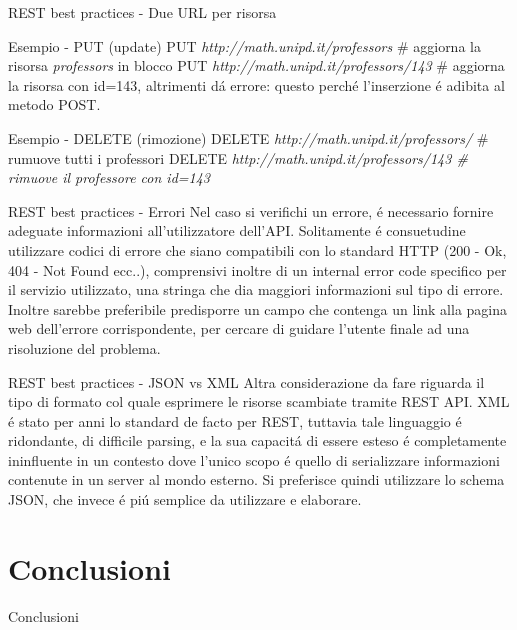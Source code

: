 \documentclass{beamer}
\begin{document}
\begin{frame}{REST best practices - Due URL per risorsa}
\begin{exampleblock}{Esempio - PUT (update)}
PUT \emph{http://math.unipd.it/professors} \# aggiorna la risorsa \emph{professors} in blocco
\newline
PUT \emph{http://math.unipd.it/professors/143} \# aggiorna la risorsa con id=143, altrimenti d\'a errore: questo perch\'e
l'inserzione \'e adibita al metodo POST.
\end{exampleblock}
\begin{exampleblock}{Esempio - DELETE (rimozione)}
DELETE \emph{http://math.unipd.it/professors/} \# rumuove tutti i professori
\newline
DELETE \emph{http://math.unipd.it/professors/143 \#  rimuove il professore con id=143}
\end{exampleblock}

\end{frame}


\begin{frame}{REST best practices - Errori}
Nel caso si verifichi un errore, \'e necessario fornire adeguate informazioni all'utilizzatore dell'API. Solitamente \'e consuetudine
utilizzare codici di errore che siano compatibili con lo standard HTTP (200 - Ok, 404 - Not Found ecc..), comprensivi inoltre di
un internal error code specifico per il servizio utilizzato, una stringa che dia maggiori informazioni sul tipo di errore. Inoltre
 sarebbe preferibile predisporre un campo che contenga un link alla pagina web dell'errore corrispondente, per cercare di guidare
 l'utente finale ad una risoluzione del problema.
\end{frame}


\begin{frame}{REST best practices - JSON vs XML}
Altra considerazione da fare riguarda il tipo di formato col quale esprimere le risorse scambiate tramite REST API. XML \'e stato
per anni lo standard de facto per REST, tuttavia tale linguaggio \'e ridondante, di difficile parsing, e la sua capacit\'a di essere
esteso \'e completamente ininfluente in un contesto dove l'unico scopo \'e quello di serializzare informazioni contenute in un
server al mondo esterno.
\newline
Si preferisce quindi utilizzare lo schema JSON, che invece \'e pi\'u semplice da utilizzare e elaborare.
\end{frame}


\section{Conclusioni}
\begin{frame}{Conclusioni}
\end{frame}
\end{document}
